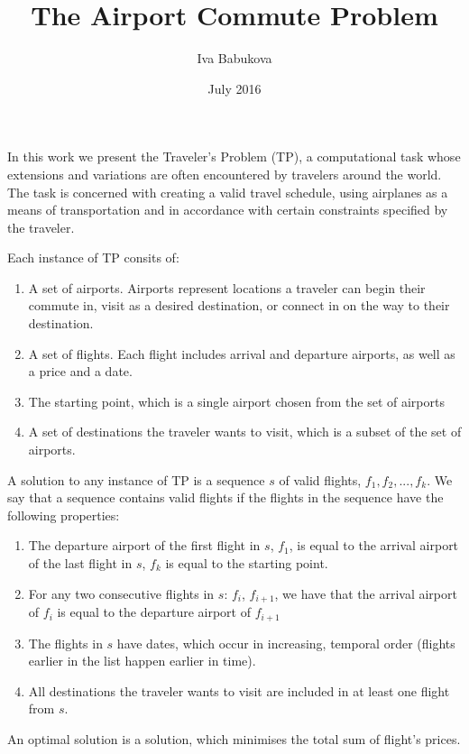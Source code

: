 \documentclass{article}
\title{The Airport Commute Problem}
\author{Iva Babukova}
\date{July 2016}
\theoremstyle{definition}
\begin{document}
\maketitle
In this work we present the Traveler's Problem (TP), a computational task whose extensions and variations are often encountered by travelers around the world. The task is concerned with creating a valid travel schedule, using airplanes as a means of transportation and in accordance with certain constraints specified by the traveler.

Each instance of TP consits of:

\begin{enumerate}
\item A set of airports. Airports represent locations a traveler can begin their commute in, visit as a desired destination, or connect in on the way to their destination.
\item A set of flights. Each flight includes arrival and departure airports, as well as a price and a date.
\item The starting point, which is a single airport chosen from the set of airports
\item A set of destinations the traveler wants to visit, which is a subset of the set of airports.
\end{enumerate}

A solution to any instance of TP is a sequence $s$ of valid flights, ${f_{1}, f_{2}, ..., f_{k}}$. We say that a sequence contains valid flights if the flights in the sequence have the following properties:

\begin{enumerate}
\item The departure airport of the first flight in $s$, $f_{1}$, is equal to the arrival airport of the last flight in $s$, $f_{k}$ is equal to the starting point.
\item For any two consecutive flights in $s$: $f_{i}$, $f_{i+1}$, we have that the arrival airport of $f_{i}$ is equal to the departure airport of $f_{i+1}$
\item The flights in $s$ have dates, which occur in increasing, temporal order (flights earlier in the list happen earlier in time).
\item All destinations the traveler wants to visit are included in at least one flight from $s$.
\end{enumerate}

An optimal solution is a solution, which minimises the total sum of flight's prices.
\end{document}
